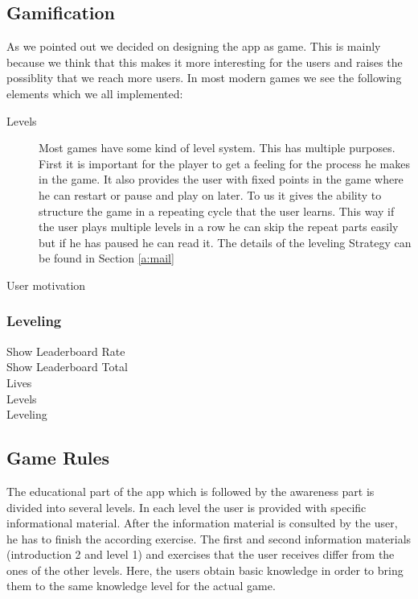 \subsection{Gamification}
As we pointed out we decided on designing the app as game.
This is mainly because we think that this makes it more interesting for the users and raises the possiblity that we reach more users.
In most modern games we see the following elements which we all implemented:
\begin{description}
\item[Levels] Most games have some kind of level system.
This has multiple purposes.
First it is important for the player to get a feeling for the process he makes in the game.
It also provides the user with fixed points in the game where he can restart or pause and play on later.
To us it gives the ability to structure the game in a repeating cycle that the user learns.
This way if the user plays multiple levels in a row he can skip the repeat parts easily but if he has paused he can read it.
The details of the leveling Strategy can be found in Section \ref{a:mail}
\end{description}
User motivation

\subsubsection{Leveling}

\begin{description}
	\item[Show Leaderboard Rate]
	\item[Show Leaderboard Total]
	\item[Lives]
	\item[Levels]
	\item[Leveling]
\end{description}


\subsection{Game Rules}
The educational part of the app which is followed by the awareness part is divided into several levels.
 In each level the user is provided with specific informational material.
 After the information material is consulted by the user, he has to finish the according exercise.
The first  and second information materials (introduction 2 and level 1) and exercises that the user receives differ from the ones of the other levels. Here, the users obtain basic knowledge in order to bring them to the same knowledge level for the actual game.
 
